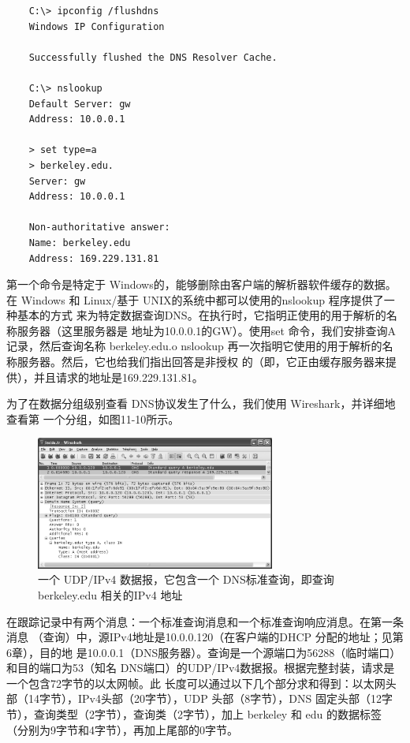 \begin{verbatim}
    C:\> ipconfig /flushdns
    Windows IP Configuration

    Successfully flushed the DNS Resolver Cache.

    C:\> nslookup
    Default Server: gw
    Address: 10.0.0.1

    > set type=a
    > berkeley.edu.
    Server: gw
    Address: 10.0.0.1

    Non-authoritative answer:
    Name: berkeley.edu
    Address: 169.229.131.81
\end{verbatim}

第一个命令是特定于 Windows的，能够删除由客户端的解析器软件缓存的数据。在
Windows 和 Linux/基于 UNIX的系统中都可以使用的nslookup 程序提供了一种基本的方式
来为特定数据查询DNS。在执行时，它指明正使用的用于解析的名称服务器（这里服务器是
地址为10.0.0.1的GW）。使用set 命令，我们安排查询A记录，然后查询名称 berkeley.edu.o
nslookup 再一次指明它使用的用于解析的名称服务器。然后，它也给我们指出回答是非授权
的（即，它正由缓存服务器来提供），并且请求的地址是169.229.131.81。

为了在数据分组级别查看 DNS协议发生了什么，我们使用 Wireshark，并详细地查看第
一个分组，如图11-10所示。

\begin{figure}[!htb]
  \centering
  \includegraphics[width=0.7\textwidth]{imgs/11/11-10.png}
  \caption{一个 UDP/IPv4 数据报，它包含一个 DNS标准查询，即查询 berkeley.edu 相关的IPv4 地址}
\end{figure}

在跟踪记录中有两个消息：一个标准查询消息和一个标准查询响应消息。在第一条消息
（查询）中，源IPv4地址是10.0.0.120（在客户端的DHCP 分配的地址；见第6章），目的地
是10.0.0.1（DNS服务器）。查询是一个源端口为56288（临时端口）和目的端口为53（知名
DNS端口）的UDP/IPv4数据报。根据完整封装，请求是一个包含72字节的以太网帧。此
长度可以通过以下几个部分求和得到：以太网头部（14字节），IPv4头部（20字节），UDP
头部（8字节），DNS 固定头部（12字节），查询类型（2字节），查询类（2字节），加上
berkeley 和 edu 的数据标签（分别为9字节和4字节），再加上尾部的0字节。

